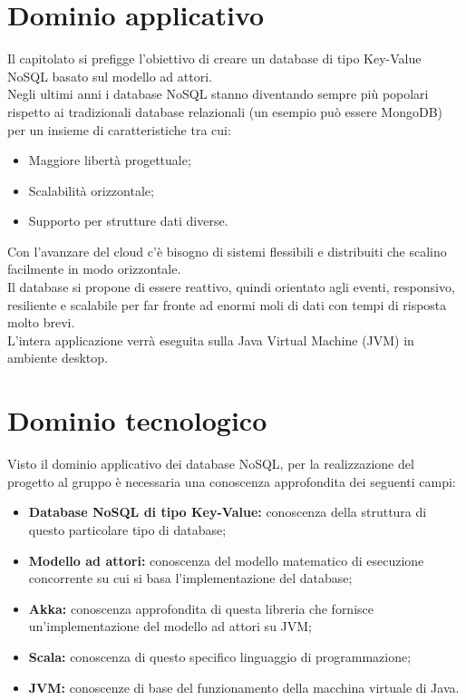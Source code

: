 \documentclass[a4paper]{report}
\begin{document}
		\section{Dominio applicativo}
			Il capitolato si prefigge l’obiettivo di creare un database di tipo Key-Value NoSQL basato sul
			modello ad attori. \\
			Negli ultimi anni i database NoSQL stanno diventando sempre più popolari  rispetto ai tradizionali
			database relazionali (un esempio può essere MongoDB) per un insieme di caratteristiche tra cui: 
			\begin{itemize}
				\item Maggiore libertà progettuale;
				\item Scalabilità orizzontale;
				\item Supporto per strutture dati diverse.
			\end{itemize}
			Con l’avanzare del cloud c’è bisogno di sistemi flessibili e distribuiti che scalino facilmente in modo
			orizzontale. \\
			Il database si propone di essere reattivo, quindi orientato agli eventi, responsivo, resiliente e
			scalabile per far fronte ad enormi moli di dati con tempi di risposta molto brevi. \\
			L’intera applicazione verrà eseguita sulla Java Virtual Machine (JVM) in ambiente
			 desktop.
		\section{Dominio tecnologico}
			Visto il dominio applicativo dei database NoSQL, per la realizzazione del progetto al gruppo è
			necessaria una conoscenza approfondita dei seguenti campi:
			\begin{itemize}
				\item \textbf{Database NoSQL di tipo Key-Value:} conoscenza della struttura di questo 
				particolare tipo di database;
				\item \textbf{Modello ad attori:} conoscenza del modello matematico di 
				esecuzione concorrente su cui si basa l'implementazione del database;
				\item \textbf{Akka:} conoscenza approfondita di questa libreria che fornisce 
				 un'implementazione del modello ad attori su JVM;
				\item \textbf{Scala:} conoscenza di questo specifico linguaggio di programmazione;
				\item \textbf{JVM:} conoscenze di base del funzionamento della macchina virtuale di Java.
			\end{itemize}
\end{document}
